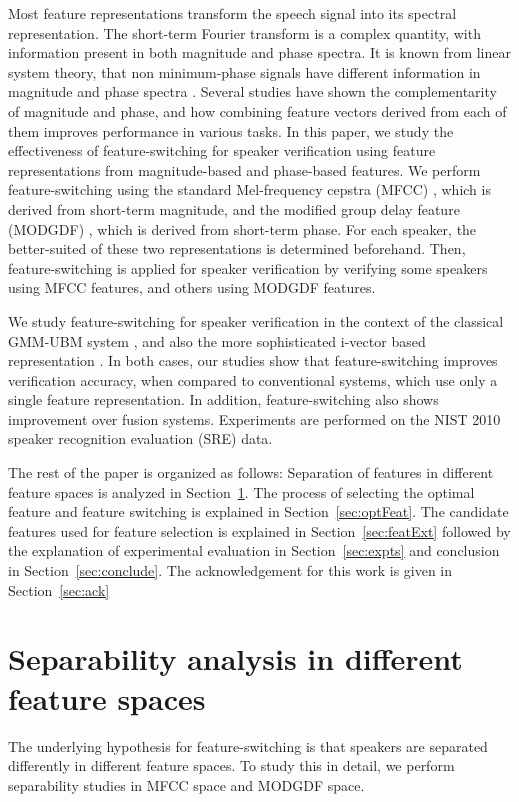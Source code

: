 \documentclass[preprint,12pt,5p]{elsarticle}
\begin{document}
Most feature representations transform the speech signal into its spectral
representation. The short-term Fourier transform is a complex quantity, with
information present in both magnitude and phase spectra. It is known from linear
system theory, that non minimum-phase signals have different information in
magnitude and phase spectra \cite{oppenheim}. Several studies \cite{complement2}
have shown the complementarity of magnitude and phase, and how combining feature
vectors derived from each of them improves performance in various tasks. In this
paper, we study the effectiveness of feature-switching for speaker verification
using feature representations from magnitude-based and phase-based features. We
perform feature-switching using the standard Mel-frequency cepstra (MFCC)
\cite{mfcc}, which is derived from short-term magnitude, and the modified group 
delay feature (MODGDF) \cite{hegdeModgdf}, which is derived from short-term phase.
For each speaker, the better-suited of these two representations is determined
beforehand. Then, feature-switching is applied for speaker verification by verifying
some speakers using MFCC features, and others using MODGDF features.

We study feature-switching for speaker verification in the context of the
classical GMM-UBM system \cite{reynoldsAdaptedGMM}, and also the more
sophisticated i-vector based representation \cite{dehak_ivector}. In both cases,
our studies show that feature-switching improves verification accuracy, when
compared to conventional systems, which use only a single feature
representation. In addition, feature-switching also shows improvement over
fusion systems. Experiments are performed on the NIST 2010 speaker recognition
evaluation (SRE) \cite{nist2010SRE} data.

The rest of the paper is organized as follows: Separation of features in different feature spaces is analyzed in Section~\ref{sec:separability}. The process of selecting the optimal feature and feature switching is explained in Section~\ref{sec:optFeat}. The candidate features used for feature selection is explained in Section~\ref{sec:featExt} followed by the explanation of experimental evaluation in Section~\ref{sec:expts} and conclusion in Section~\ref{sec:conclude}. The acknowledgement for this work is given in Section~\ref{sec:ack}

\section{Separability analysis in different feature spaces}
\label{sec:separability}
The underlying hypothesis for feature-switching is that speakers are separated
differently in different feature spaces. To study this in detail, we
perform separability studies in MFCC space and MODGDF space.
\end{document}
